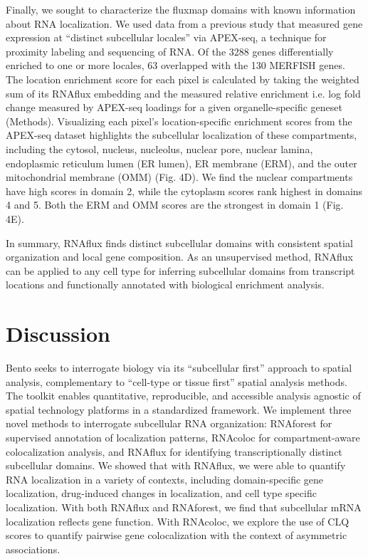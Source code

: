 Finally, we sought to characterize the fluxmap domains with known information about RNA localization. We used data from a previous study that measured gene expression at “distinct subcellular locales” via APEX-seq, a technique for proximity labeling and sequencing of RNA\cite{fazalAtlasSubcellularRNA2019}. Of the 3288 genes differentially enriched to one or more locales, 63 overlapped with the 130 MERFISH genes. The location enrichment score for each pixel is calculated by taking the weighted sum of its RNAflux embedding and the measured relative enrichment i.e. log fold change measured by APEX-seq loadings for a given organelle-specific geneset (Methods). Visualizing each pixel's location-specific enrichment scores from the APEX-seq dataset highlights the subcellular localization of these compartments, including the cytosol, nucleus, nucleolus, nuclear pore, nuclear lamina, endoplasmic reticulum lumen (ER lumen), ER membrane (ERM), and the outer mitochondrial membrane (OMM) (Fig. 4D). We find the nuclear compartments have high scores in domain 2, while the cytoplasm scores rank highest in domains 4 and 5. Both the ERM and OMM scores are the strongest in domain 1 (Fig. 4E).

In summary, RNAflux finds distinct subcellular domains with consistent spatial organization and local gene composition. As an unsupervised method, RNAflux can be applied to any cell type for inferring subcellular domains from transcript locations and functionally annotated with biological enrichment analysis.


\section{Discussion}

Bento seeks to interrogate biology via its “subcellular first” approach to spatial analysis, complementary to “cell-type or tissue first” spatial analysis methods. The toolkit enables quantitative, reproducible, and accessible analysis agnostic of spatial technology platforms in a standardized framework. We implement three novel methods to interrogate subcellular RNA organization: RNAforest for supervised annotation of localization patterns, RNAcoloc for compartment-aware colocalization analysis, and RNAflux for identifying transcriptionally distinct subcellular domains. We showed that with RNAflux, we were able to quantify RNA localization in a variety of contexts, including domain-specific gene localization, drug-induced changes in localization, and cell type specific localization. With both RNAflux and RNAforest, we find that subcellular mRNA localization reflects gene function. With RNAcoloc, we explore the use of CLQ scores to quantify pairwise gene colocalization with the context of asymmetric associations. 

